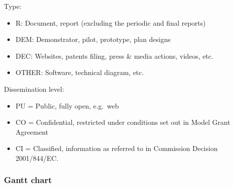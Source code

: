 \documentclass[]{article}
\providecommand{\tightlist}{%
  \setlength{\itemsep}{0pt}\setlength{\parskip}{0pt}}
\begin{document}
Type:

\begin{itemize}
\tightlist
\item
  R: Document, report (excluding the periodic and final reports)
\item
  DEM: Demonstrator, pilot, prototype, plan designs
\item
  DEC: Websites, patents filing, press \& media actions, videos, etc.
\item
  OTHER: Software, technical diagram, etc.
\end{itemize}

Dissemination level:

\begin{itemize}
\tightlist
\item
  PU = Public, fully open, e.g.~web
\item
  CO = Confidential, restricted under conditions set out in Model Grant
  Agreement
\item
  CI = Classified, information as referred to in Commission Decision
  2001/844/EC.
\end{itemize}

\hypertarget{gantt-chart}{%
\subsubsection{Gantt chart}\label{gantt-chart}}
\end{document}
